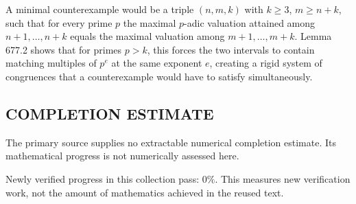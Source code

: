 A minimal counterexample would be a triple $(n,m,k)$ with $k\ge 3$, $m\ge n+k$, such that for every prime $p$ the maximal $p$-adic valuation attained among $n+1,\dots,n+k$ equals the maximal valuation among $m+1,\dots,m+k$. Lemma 677.2 shows that for primes $p>k$, this forces the two intervals to contain matching multiples of $p^e$ at the same exponent $e$, creating a rigid system of congruences that a counterexample would have to satisfy simultaneously.



\subsection*{COMPLETION ESTIMATE}
The primary source supplies no extractable numerical completion estimate. Its mathematical progress is not numerically assessed here.

Newly verified progress in this collection pass: $0\%$. This measures new verification work, not the amount of mathematics achieved in the reused text.
